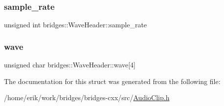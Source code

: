 \subsubsection{\texorpdfstring{sample\+\_\+rate}{sample\_rate}}
{\footnotesize\ttfamily unsigned int bridges\+::\+Wave\+Header\+::sample\+\_\+rate}

\mbox{\label{structbridges_1_1_wave_header_a7f2215f8069f1ea4e5400c8452868fd3}} 
\subsubsection{\texorpdfstring{wave}{wave}}
{\footnotesize\ttfamily unsigned char bridges\+::\+Wave\+Header\+::wave\mbox{[}4\mbox{]}}



The documentation for this struct was generated from the following file\+:\begin{DoxyCompactItemize}
\item 
/home/erik/work/bridges/bridges-\/cxx/src/\hyperlink{_audio_clip_8h}{Audio\+Clip.\+h}\end{DoxyCompactItemize}

